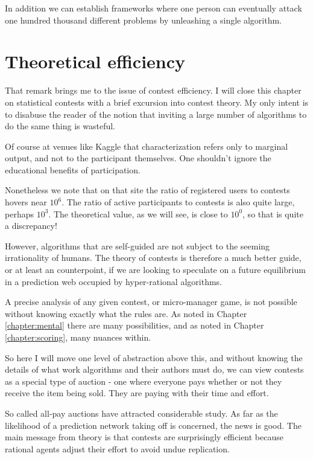 In addition we can establish frameworks where one person can eventually attack one hundred thousand different problems by unleashing a single algorithm.

\section{Theoretical efficiency}

That remark brings me to the issue of contest efficiency. I will close this chapter on statistical contests with a brief excursion into contest theory. My only intent is to disabuse the reader of the notion that inviting a large number of algorithms to do the same thing is wasteful. 

Of course at venues like Kaggle that characterization refers only to marginal output, and not to the participant themselves. One shouldn't ignore the educational benefits of participation.

Nonetheless we note that on that site the ratio of registered users to contests hovers near $10^6$. The ratio of active participants to contests is also quite large, perhaps $10^3$. The theoretical value, as we will see, is close to $10^0$, so that is quite a discrepancy! 

However, algorithms that are self-guided are not subject to the seeming irrationality of humans. The theory of contests is therefore a much better guide, or at least an counterpoint, if we are looking to speculate on a future equilibrium in a prediction web occupied by hyper-rational algorithms. 

A precise analysis of any given contest, or micro-manager game, is not possible without knowing exactly what the rules are. As noted in Chapter \ref{chapter:mental} there are many possibilities, and as noted in Chapter \ref{chapter:scoring}, many nuances within. 

So here I will move one level of abstraction above this, and without knowing the details of what work algorithms and their authors must do, we can view contests as a special type of auction - one where everyone pays whether or not they receive the item being sold. They are paying with their time and effort.  

So called all-pay auctions have attracted considerable study. As far as the likelihood of a prediction network taking off is concerned, the news is good. The main message from theory is that contests are surprisingly efficient because rational agents adjust their effort to avoid undue replication. 



